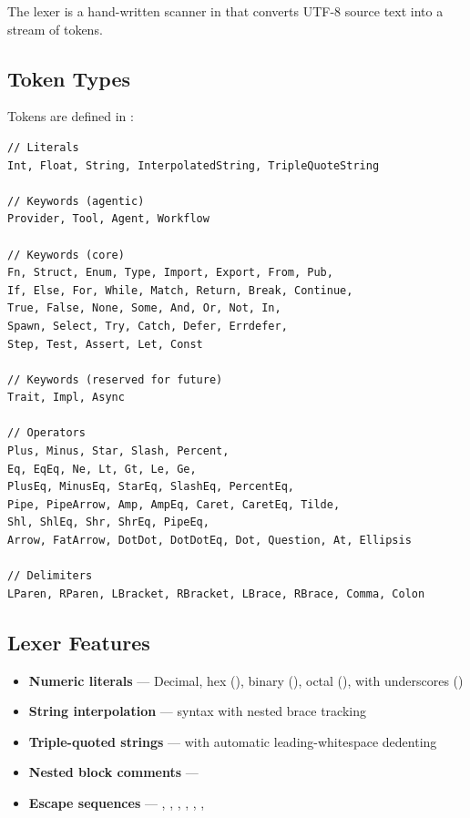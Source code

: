 The lexer is a hand-written scanner in  that converts UTF-8 source text into a stream of tokens.

\subsection{Token Types}

Tokens are defined in :

\begin{lstlisting}[language={},numbers=none]
// Literals
Int, Float, String, InterpolatedString, TripleQuoteString

// Keywords (agentic)
Provider, Tool, Agent, Workflow

// Keywords (core)
Fn, Struct, Enum, Type, Import, Export, From, Pub,
If, Else, For, While, Match, Return, Break, Continue,
True, False, None, Some, And, Or, Not, In,
Spawn, Select, Try, Catch, Defer, Errdefer,
Step, Test, Assert, Let, Const

// Keywords (reserved for future)
Trait, Impl, Async

// Operators
Plus, Minus, Star, Slash, Percent,
Eq, EqEq, Ne, Lt, Gt, Le, Ge,
PlusEq, MinusEq, StarEq, SlashEq, PercentEq,
Pipe, PipeArrow, Amp, AmpEq, Caret, CaretEq, Tilde,
Shl, ShlEq, Shr, ShrEq, PipeEq,
Arrow, FatArrow, DotDot, DotDotEq, Dot, Question, At, Ellipsis

// Delimiters
LParen, RParen, LBracket, RBracket, LBrace, RBrace, Comma, Colon
\end{lstlisting}

\subsection{Lexer Features}

\begin{itemize}
    \item \textbf{Numeric literals} --- Decimal, hex (), binary (), octal (), with underscores ()
    \item \textbf{String interpolation} ---  syntax with nested brace tracking
    \item \textbf{Triple-quoted strings} ---  with automatic leading-whitespace dedenting
    \item \textbf{Nested block comments} --- 
    \item \textbf{Escape sequences} --- \code{\\n}, \code{\\t}, \code{\\r}, \code{\\\\}, , \code{\\\{}, \code{\\\}}
\end{itemize}

